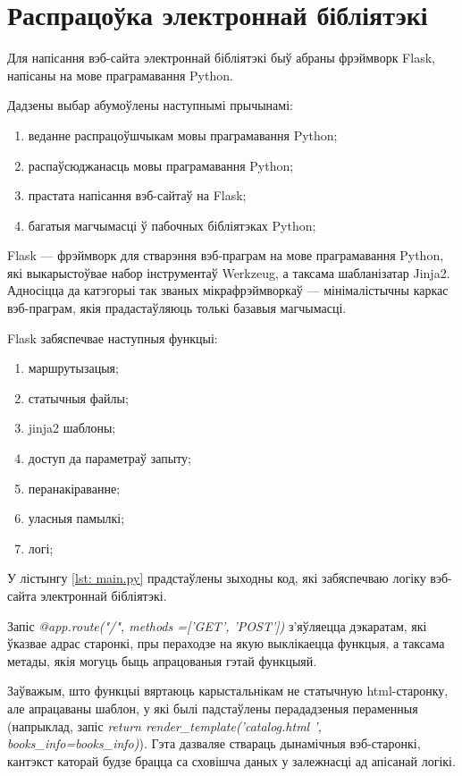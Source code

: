 \section{Распрацоўка электроннай бібліятэкі}

Для напісання вэб-сайта электроннай бібліятэкі быў абраны фрэймворк Flask,
напісаны на мове праграмавання Python.

Дадзены выбар абумоўлены наступнымі прычынамі:
\begin{enumerate}
    \item веданне распрацоўшчыкам мовы праграмавання Python;
    \item распаўсюджанасць мовы праграмавання Python;
    \item прастата напісання вэб-сайтаў на Flask;
    \item багатыя магчымасці ў пабочных бібліятэках Python;
\end{enumerate}

Flask --- фрэймворк для стварэння вэб-праграм на мове праграмавання Python, які выкарыстоўвае набор інструментаў Werkzeug, а таксама шабланізатар Jinja2. Адносіцца да катэгорыі так званых мікрафрэймворкаў --- мінімалістычны каркас вэб-праграм, якія прадастаўляюць толькі базавыя магчымасці.

Flask забяспечвае наступныя функцыі:
\begin{enumerate}
    \item маршрутызацыя;
    \item статычныя файлы;
    \item jinja2 шаблоны;
    \item доступ да параметраў запыту;
    \item перанакіраванне;
    \item уласныя памылкі;
    \item логі;
\end{enumerate}

У лістынгу \ref{lst: main.py} прадстаўлены зыходны код, які забяспечваю логіку вэб-сайта электроннай
бібліятэкі.



Запіс \textit{@app.route("/", methods =['GET', 'POST'])} з'яўляецца дэкаратам, які ўказвае
адрас старонкі, пры пераходзе на якую выклікаецца функцыя, а таксама метады, якія могуць
быць апрацованыя гэтай функцыяй.

Заўважым, што функцыі вяртаюць карыстальнікам не статычную html-старонку,
але апрацаваны шаблон, у які былі падстаўлены перададзеныя пераменныя
(напрыклад, запіс \textit{return render\_template('catalog.html ', books\_info=books\_info)}).
Гэта дазваляе ствараць дынамічныя вэб-старонкі, кантэкст каторай будзе брацца са сховішча
даных у залежнасці ад апісанай логікі.

